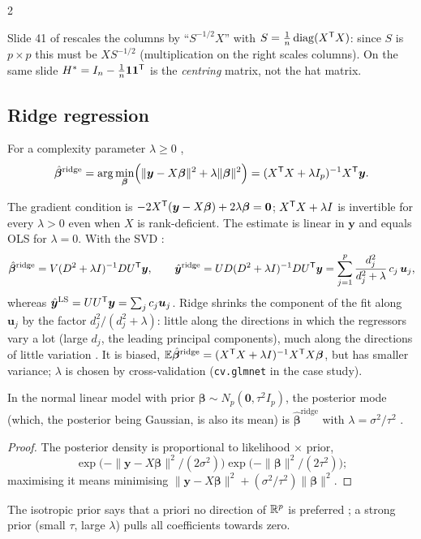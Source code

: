 \begin{paracol}{2}
\begin{coursenote}
Slide 41 of  rescales the columns by ``$S^{-1/2}X$'' with $S=\frac1n\operatorname{diag}(X^{\mathsf T} X)$: since $S$ is $p\times p$ this must be
$XS^{-1/2}$ (multiplication on the right scales columns). On the same slide $H^*=I_n-\frac1n\bm 1\bm 1^{\mathsf T}$ is the
\emph{centring} matrix, not the hat matrix.
\end{coursenote}

\subsection{Ridge regression}
\begin{definition}[Ridge]
For a complexity parameter $\lambda\ge0$ ,
\[
  \hat{\bm\beta}^{\text{ridge}}=\arg\min_{\bm\beta}\Bigl(\|\bm y-X\bm\beta\|^2+\lambda\|\bm\beta\|^2\Bigr)=(X^{\mathsf T} X+\lambda I_p)^{-1}X^{\mathsf T}\bm y .
\]
\end{definition}
The gradient condition is $-2X^{\mathsf T}(\bm y-X\bm\beta)+2\lambda\bm\beta=\bm 0$; $X^{\mathsf T} X+\lambda I$ is invertible for every $\lambda>0$ even when $X$ is
rank-deficient. The estimate is linear in $\bm y$ and equals OLS for $\lambda=0$. With the SVD
:
\[
  \hat{\bm\beta}^{\text{ridge}}=V(D^2+\lambda I)^{-1}DU^{\mathsf T}\bm y,\qquad
  \hat{\bm y}^{\text{ridge}}=UD(D^2+\lambda I)^{-1}DU^{\mathsf T}\bm y=\sum_{j=1}^p\frac{d_j^2}{d_j^2+\lambda}\,c_j\,\bm u_j ,
\]
whereas $\hat{\bm y}^{\text{LS}}=UU^{\mathsf T}\bm y=\sum_jc_j\bm u_j$. Ridge shrinks the component of the fit along $\bm u_j$ by the factor
$d_j^2/(d_j^2+\lambda)$: little along the directions in which the regressors vary a lot (large $d_j$, the leading principal
components), much along the directions of little variation . It is biased,
$\mathbb{E}\hat{\bm\beta}^{\text{ridge}}=(X^{\mathsf T} X+\lambda I)^{-1}X^{\mathsf T} X\bm\beta$, but has smaller variance; $\lambda$ is chosen by cross-validation
(\texttt{cv.glmnet} in the case study).

\begin{proposition}\label{ch05:prop-ridgebayes}
In the normal linear model with prior $\bm\beta\sim N_p(\bm 0,\tau^2I_p)$, the posterior mode (which, the posterior being Gaussian,
is also its mean) is $\hat{\bm\beta}^{\text{ridge}}$ with $\lambda=\sigma^2/\tau^2$ .
\end{proposition}
\begin{proof}
The posterior density is proportional to likelihood $\times$ prior,
\[\exp\bigl(-\|\bm y-X\bm\beta\|^2/(2\sigma^2)\bigr)\exp\bigl(-\|\bm\beta\|^2/(2\tau^2)\bigr);\]
maximising it means minimising $\|\bm y-X\bm\beta\|^2+(\sigma^2/\tau^2)\|\bm\beta\|^2$.
\end{proof}
The isotropic prior says that a priori no direction of $\mathbb{R}^p$ is preferred ; a strong prior (small
$\tau$, large $\lambda$) pulls all coefficients towards zero.


\end{paracol}
